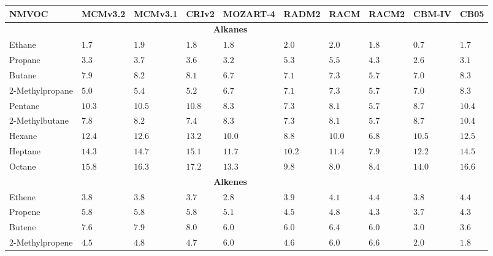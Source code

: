 {%
    \renewcommand{\arraystretch}{1.1}%
    \begin{table}%
        \begin{center}%
            \begin{tabular}{llllllllll}%
                \hline \hline
                \textbf{NMVOC} & \textbf{MCMv3.2} & \textbf{MCMv3.1} & \textbf{CRIv2} & \textbf{MOZART-4} & \textbf{RADM2} & \textbf{RACM} & \textbf{RACM2} & \textbf{CBM-IV} & \textbf{CB05} \\ 
                \hline \hline \multicolumn{9}{c}{\textbf{Alkanes}}  \\ \hline
                Ethane & $1.7$ & $1.9$ & $1.8$ & $1.8$ & $2.0$ & $2.0$ & $1.8$ & $0.7$ & $1.7$ \\
                Propane & $3.3$ & $3.7$ & $3.6$ & $3.2$ & $5.3$ & $5.5$ & $4.3$ & $2.6$ & $3.1$ \\
                Butane & $7.9$ & $8.2$ & $8.1$ & $6.7$ & $7.1$ & $7.3$ & $5.7$ & $7.0$ &$8.3$ \\
                $2$-Methylpropane & $5.0$ & $5.4$ & $5.2$ & $6.7$ & $7.1$ & $7.3$ & $5.7$ & $7.0$ & $8.3$ \\
                Pentane & $10.3$ & $10.5$ & $10.8$ & $8.3$ & $7.3$ & $8.1$ & $5.7$ & $8.7$ & $10.4$ \\
                $2$-Methylbutane & $7.8$ & $8.2$ & $7.4$ & $8.3$ & $7.3$ & $8.1$ & $5.7$ & $8.7$ & $10.4$ \\
                Hexane & $12.4$ & $12.6$ & $13.2$ & $10.0$ & $8.8$ & $10.0$ & $6.8$ & $10.5$ & $12.5$ \\
                Heptane & $14.3$ & $14.7$ & $15.1$ & $11.7$ & $10.2$ & $11.4$ & $7.9$ & $12.2$ & $14.5$ \\
                Octane & $15.8$ & $16.3$ & $17.2$ & $13.3$ & $9.8$ & $8.0$ & $8.4$ & $14.0$ & $16.6$ \\ \hline
                \multicolumn{9}{c}{\textbf{Alkenes}} \\ \hline
                Ethene & $3.8$ & $3.8$ & $3.7$ & $2.8$ & $3.9$ & $4.1$ & $4.4$ & $3.8$ & $4.4$ \\
                Propene & $5.8$ & $5.8$ & $5.8$ & $5.1$ & $4.5$ & $4.8$ & $4.3$ & $3.7$ & $4.3$ \\
                Butene & $7.6$ & $7.9$ & $8.0$ & $6.0$ & $6.0$ & $6.4$ & $6.0$ & $3.0$ & $3.6$ \\
                $2$-Methylpropene & $4.5$ & $4.8$ & $4.7$ & $6.0$ & $4.6$ & $6.0$ & $6.6$ & $2.0$ & $1.8$ \\

\end{tabular}
\end{center}
\end{table}}
